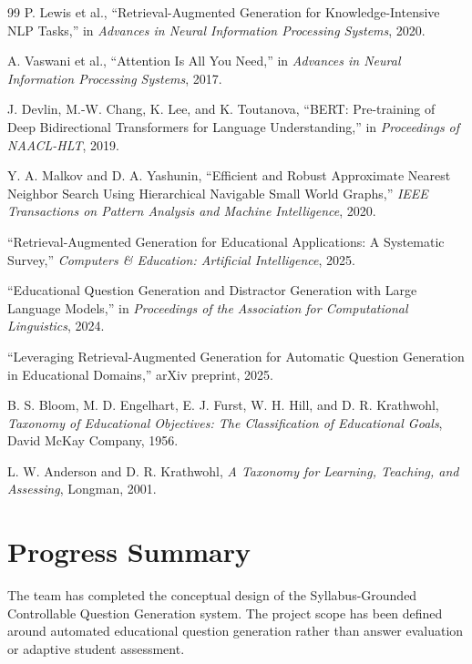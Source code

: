 \documentclass[12pt,a4paper]{report}
\begin{document}
\begin{thebibliography}{99}
P. Lewis et al.,
``Retrieval-Augmented Generation for Knowledge-Intensive NLP Tasks,''
in \textit{Advances in Neural Information Processing Systems}, 2020.

A. Vaswani et al.,
``Attention Is All You Need,''
in \textit{Advances in Neural Information Processing Systems}, 2017.

J. Devlin, M.-W. Chang, K. Lee, and K. Toutanova,
``BERT: Pre-training of Deep Bidirectional Transformers for Language Understanding,''
in \textit{Proceedings of NAACL-HLT}, 2019.

Y. A. Malkov and D. A. Yashunin,
``Efficient and Robust Approximate Nearest Neighbor Search Using Hierarchical Navigable Small World Graphs,''
\textit{IEEE Transactions on Pattern Analysis and Machine Intelligence}, 2020.

``Retrieval-Augmented Generation for Educational Applications: A Systematic Survey,''
\textit{Computers \& Education: Artificial Intelligence}, 2025.

``Educational Question Generation and Distractor Generation with Large Language Models,''
in \textit{Proceedings of the Association for Computational Linguistics}, 2024.

``Leveraging Retrieval-Augmented Generation for Automatic Question Generation in Educational Domains,''
arXiv preprint, 2025.

B. S. Bloom, M. D. Engelhart, E. J. Furst, W. H. Hill, and D. R. Krathwohl,
\textit{Taxonomy of Educational Objectives: The Classification of Educational Goals},
David McKay Company, 1956.

L. W. Anderson and D. R. Krathwohl,
\textit{A Taxonomy for Learning, Teaching, and Assessing},
Longman, 2001.

\end{thebibliography}


\chapter*{Progress Summary}

The team has completed the conceptual design of the Syllabus-Grounded Controllable Question Generation system. The project scope has been defined around automated educational question generation rather than answer evaluation or adaptive student assessment.
\end{document}

